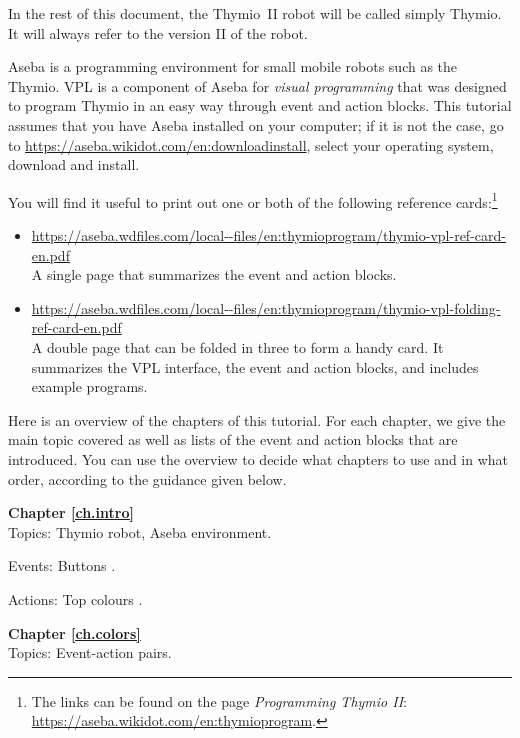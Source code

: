 In the rest of this document, the Thymio~II robot will be called simply Thymio.
It will always refer to the version II of the robot.

Aseba is a programming environment for small mobile robots such as the Thymio.
VPL is a component of Aseba for \textit{visual programming} that was designed to program Thymio in an easy way through event and action blocks.
This tutorial assumes that you have Aseba installed on your computer; if it is not the case, go to \url{https://aseba.wikidot.com/en:downloadinstall}, select your operating system, download and install.


You will find it useful to print out one or both of the following reference
cards:\footnote{The links can be found on the page \textit{Programming Thymio II}:\\
\url{https://aseba.wikidot.com/en:thymioprogram}.}

\begin{itemize}
\item \url{https://aseba.wdfiles.com/local--files/en:thymioprogram/thymio-vpl-ref-card-en.pdf}\\
A single page that summarizes the event and action blocks.
\item \url{https://aseba.wdfiles.com/local--files/en:thymioprogram/thymio-vpl-folding-ref-card-en.pdf}\\
A double page that can be folded in three to form a handy card.
It summarizes the VPL interface, the event and action blocks, and includes example programs.
\end{itemize}


Here is an overview of the chapters of this tutorial.
For each chapter, we give the main topic covered as well as lists
of the event and action blocks that are introduced.
You can use the overview to decide what chapters to use
and in what order, according to the guidance given below.

{\centering \textbf{Chapter \ref{ch.intro}}\\}
Topics: Thymio robot, Aseba environment.

Events: Buttons .

Actions: Top colours .

\bigskip
\bigskip

{\centering \textbf{Chapter \ref{ch.colors}}\\}
Topics: Event-action pairs.

